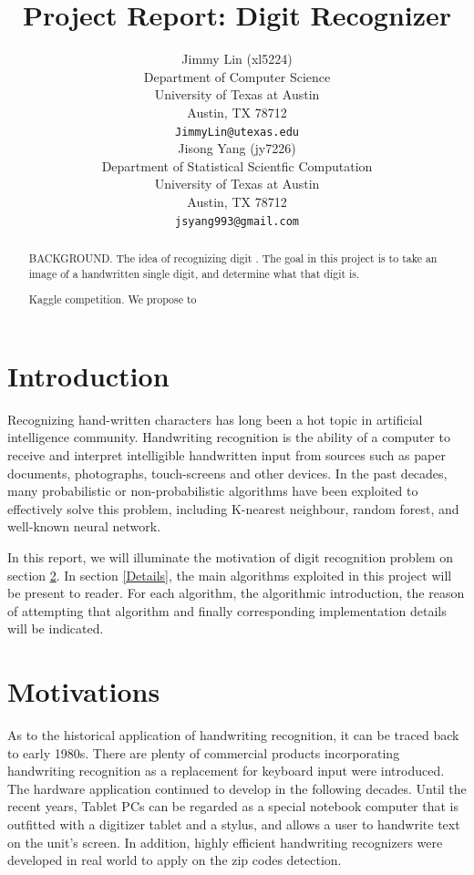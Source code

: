 \documentclass{article} %
\title{Project Report: Digit Recognizer}
\author{
Jimmy Lin (xl5224) \\
Department of Computer Science\\
University of Texas at Austin\\
Austin, TX 78712 \\
\texttt{JimmyLin@utexas.edu} \\
\And
Jisong Yang (jy7226) \\
Department of Statistical Scientfic Computation\\
University of Texas at Austin\\
Austin, TX 78712 \\
\texttt{jsyang993@gmail.com} \\
}
\begin{document}
\maketitle

\begin{abstract}
    BACKGROUND. The idea of recognizing digit . 
    The goal in this project is to take an image of a handwritten single
    digit, and determine what that digit is.  
    
    Kaggle competition. 
    We propose to 

\end{abstract}

\section{Introduction}
Recognizing hand-written characters has long been a hot topic in artificial
intelligence community. 
Handwriting recognition is the ability of a computer to receive and
interpret intelligible handwritten input from sources such as paper documents,
photographs, touch-screens and other devices.
In the past decades, many probabilistic or non-probabilistic algorithms have
been exploited to effectively solve this problem, including K-nearest
neighbour, random forest, and well-known neural network. 

In this report, we will illuminate the motivation of digit recognition
problem on section \ref{Motivation}. In section \ref{Details}, the
 main algorithms exploited in this project will be present to reader. For each
 algorithm, the algorithmic introduction, the reason of attempting that
 algorithm and finally corresponding implementation details will be indicated. 

\section{Motivations} \label{Motivation}
As to the historical application of handwriting recognition, 
it can be traced back to early 1980s.  There are plenty of commercial products
incorporating handwriting recognition as a replacement for keyboard input were
introduced. The hardware application continued to develop
in the following decades.  Until the recent years, Tablet PCs can be regarded
as a special notebook computer that is outfitted with a digitizer tablet and a
stylus, and allows a user to handwrite text on the unit's screen. In addition,
highly efficient handwriting recognizers were developed in real world to apply
on the zip codes detection.
\end{document}
